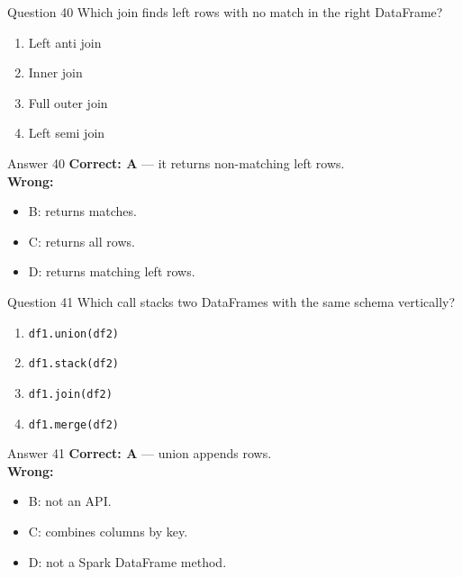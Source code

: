\documentclass[aspectratio=169,11pt]{beamer}
\begin{document}
\begin{frame}{Question 40}
Which join finds left rows with no match in the right DataFrame?
\begin{enumerate}[label=\Alph*.]
\item Left anti join
\item Inner join
\item Full outer join
\item Left semi join
\end{enumerate}
\end{frame}
\begin{frame}{Answer 40}
\textbf{Correct: A} --- it returns non-matching left rows.\\
\vspace{0.5em}
\textbf{Wrong:}
\begin{itemize}
\item B: returns matches.
\item C: returns all rows.
\item D: returns matching left rows.
\end{itemize}
\end{frame}

\begin{frame}{Question 41}
Which call stacks two DataFrames with the same schema vertically?
\begin{enumerate}[label=\Alph*.]
\item \texttt{df1.union(df2)}
\item \texttt{df1.stack(df2)}
\item \texttt{df1.join(df2)}
\item \texttt{df1.merge(df2)}
\end{enumerate}
\end{frame}
\begin{frame}{Answer 41}
\textbf{Correct: A} --- union appends rows.\\
\vspace{0.5em}
\textbf{Wrong:}
\begin{itemize}
\item B: not an API.
\item C: combines columns by key.
\item D: not a Spark DataFrame method.
\end{itemize}
\end{frame}
\end{document}
